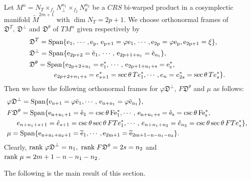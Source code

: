 \documentclass[reqno]{amsart}
\theoremstyle{plain}
\theoremstyle{remark}
\numberwithin{equation}{section}
\begin{document}
Let $M^n=N_T\times_{f_1}N^{n_{1}}_\perp\times_{f_2}N^{n_{2}}_\theta$ be a $CRS$ bi-warped product in a cosymplectic manifold $\widetilde M^{2m+1}$ with $\dim N_{T}=2p+1$. 
We choose orthonormal frames of ${\mathfrak{D}^{T}},\, {\mathfrak{D}}^\perp$ and ${\mathfrak{D}}^\theta$ of $TM^n$ given respectively by
\begin{align*}
&{\mathfrak{D}^{T}}=\rm{Span}\{e_1,\,\cdots,e_{p},\,e_{p+1}=\varphi e_{1},\,\cdots,e_{2p}=\varphi e_{p}, e_{2p+1}={\mathfrak{\xi}}\},\;\\&{\mathfrak{D}}^\perp=\rm{Span}\{e_{2p+2}=\bar e_1,\,\cdots,\,e_{2p+1+n_1}=\bar e_{n_1}\},\\
&{\mathfrak{D}}^\theta=\rm{Span}\{e_{2p+2+n_1}=e_1^{*},\,\cdots,\,e_{2p+1+n_1+s}=e_s^{*},\,\\&\hskip.5in e_{2p+2+n_1+s}=e_{s+1}^{*}=\sec\theta\, Te_1^{*},\cdots, e_{n}=e_{2s}^{*}=\sec\theta\, Te_{s}^{*}\}.
\end{align*}
Then we have the following orthonormal frames for $\varphi{\mathfrak{D}}^\perp,\,F\mathfrak{D}^\theta$ and $\mu$ as follows:   
\begin{align*}
&\varphi{\mathfrak{D}}^\perp=\rm{Span}\{e_{n+1}= \varphi\bar e_1,\cdots,\, e_{n+n_1}=\varphi\bar e_{n_1}\},\\
&F\mathfrak{D}^\theta=\rm{Span}\{e_{n+n_1+1}=\hat{e}_{1}=\csc\theta\, Fe_{1}^{*},\cdots,\,e_{n+n_1+s}=\hat{e}_{s}=\csc\theta\, Fe_{s}^{*},\\
&\hskip.2in e_{n+n_1+s+1}=\hat{e}_{s+1}=\csc\theta\sec\theta\, FTe_{1}^{*},\cdots,\, e_{n+n_1+n_2}=\hat{e}_{n_2}=\csc\theta\sec\theta\, FTe_{s}^{*}\},\\
&\mu=\rm{Span}\{e_{n+n_1+n_2+1}=\widetilde e_{1},\cdots, e_{2m+1}=\widetilde e_{2m+1-n-n_1-n_2}\}.
\end{align*}
Clearly,  ${\rm rank}\;{\varphi\mathfrak{D}}^\perp=n_1,\,\,{\rm rank}\; F{\mathfrak{D}}^\theta=2s=n_2$ and ${\rm rank}\;\mu=2m+1-n-n_1-n_2$.

The following is the main result of this section.
\end{document}
